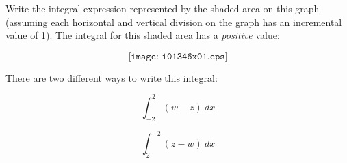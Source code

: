 

Write the integral expression represented by the shaded area on this graph (assuming each horizontal and vertical division on the graph has an incremental value of 1).  The integral for this shaded area has a {\it positive} value:

$$\texttt{[image: i01346x01.eps]}$$







There are two different ways to write this integral:

$$\int_{-2}^{2} (w - z) \> dx$$

$$\int_{2}^{-2} (z - w) \> dx$$












